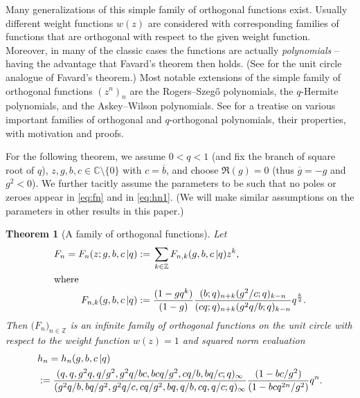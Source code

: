 \documentclass[reqno,12pt]{amsart}
\newtheorem{theorem}{Theorem}
\theoremstyle{remark}
\numberwithin{equation}{section}
\newcommand{\Z}{\mathbb Z}
\newcommand{\C}{\mathbb C}
\begin{document}
Many generalizations of this simple family of orthogonal functions exist.
Usually different weight functions $w(z)$ are considered
with corresponding families of functions that are orthogonal
with respect to the given weight function.
Moreover, in many of the classic cases the functions are actually
\textit{polynomials} -- having the advantage that Favard's theorem
then holds. (See
\cite{ENZG} for the unit circle analogue of Favard's theorem.)
Most notable extensions of the simple family of orthogonal functions
$(z^n)_{n}$ are the Rogers--Szeg\H{o} polynomials, the $q$-Hermite
polynomials, and the Askey--Wilson polynomials.
See \cite{I} for a treatise on
various important families of orthogonal and $q$-orthogonal
polynomials, their properties, with motivation and proofs.

For the following theorem, we assume
$0<q<1$ (and fix the branch of square root of $q$),
$z,g,b,c\in\C\setminus\{0\}$ with $c=\overline{b}$,
and choose $\Re(g)=0$ (thus $\overline{g}=-g$ and $g^2<0$).
We further tacitly assume the parameters to be such that
no poles or zeroes appear in \eqref{eq:fn} and in \eqref{eq:hn1}.
(We will make similar assumptions on the parameters
in other results in this paper.)
\begin{theorem}[A family of orthogonal functions]\label{thm:orthf}
  Let
  \begin{subequations}\label{eq:fn}
\begin{align}\label{eq:fna}
    F_n=F_n(z;g,b,c\,|q):={}&\sum_{k\in\Z}F_{n,k}(g,b,c\,|q)z^k,\\
\intertext{where}
F_{n,k}(g,b,c\,|q):={}&\frac{(1-gq^k)}{(1-g)}
\frac{(b;q)_{n+k}(g^2/c;q)_{k-n}}{(cq;q)_{n+k}(g^2q/b;q)_{k-n}}q^{\frac k2}.
\end{align}                    
\end{subequations}
Then $\big(F_n\big)_{n\in\Z}$ is an \textit{infinite family of
  orthogonal functions} on the unit circle with respect to the
weight function $w(z)=1$
and squared norm evaluation
\begin{align}\label{eq:hn1}
  &h_n=h_n(g,b,c\,|q)\notag\\
  &:=
\frac{(q,q,g^2q,q/g^2,g^2q/bc,bcq/g^2,cq/b,bq/c;q)_\infty}
{(g^2q/b,bq/g^2,g^2q/c,cq/g^2,bq,q/b,cq,q/c;q)_\infty}
  \frac{(1-bc/g^2)}{(1-bcq^{2n}/g^2)}q^n.
\end{align}
\end{theorem}
\end{document}
